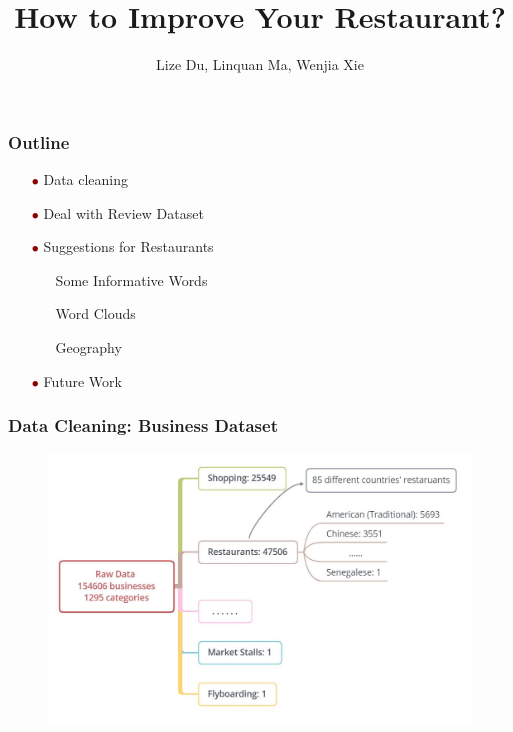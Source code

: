 \documentclass[notheorems, aspectratio=54]{beamer}
\title[Suggestions for Retaurants]{\LARGE\textbf{{How to Improve Your Restaurant?}}}
\author[L.Du, L.Ma, W.Xie]{Lize Du, Linquan Ma, Wenjia Xie}
\institute{STAT 628}
\renewcommand\textbullet{\ensuremath{\bullet}}
\begin{document}
	
	\begin{frame}
	\titlepage
\end{frame}

\begin{frame}
\frametitle{Outline}
\begin{itemize}
	\item[\textcolor{darkred}{\textbullet}] Data cleaning
	\vspace{2ex}
	\item[\textcolor{darkred}{\textbullet}] Deal with Review Dataset
		\vspace{2ex}
	\item[\textcolor{darkred}{\textbullet}] Suggestions for Restaurants
	\begin{itemize}
		\item[\textcolor{darkred}{\checkmark}] Some Informative Words	
		\item[\textcolor{darkred}{\checkmark}] Word Clouds
		\item[\textcolor{darkred}{\checkmark}] Geography
	\end{itemize}
	\vspace{2ex}
	\item[\textcolor{darkred}{\textbullet}] Future Work
\end{itemize}
\end{frame}

\begin{frame}
\frametitle{Data Cleaning: Business Dataset}
\begin{figure}[H]
	\centering
	\includegraphics[width=4.6in]{dataclean_business.jpg}
\end{figure}
\end{frame}
\end{document}
